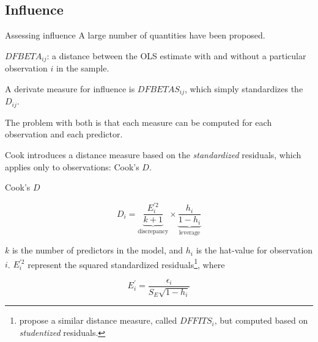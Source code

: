 \documentclass[12pt,english,pdf,xcolor=dvipsnames,aspectratio=169,handout]{beamer}\usepackage[]{graphicx}\usepackage[]{xcolor}
\begin{document}
\subsection{Influence}

\begin{frame}{Assessing influence}
A large number of quantities have been proposed.\bigskip

\underline{$DFBETA_{ij}$}: a distance between the OLS estimate with and without a particular observation $i$ in the sample.\bigskip

A derivate measure for influence is \underline{$DFBETAS_{ij}$}, which simply standardizes the $D_{ij}$.\bigskip

The problem with both is that each measure can be computed for each observation and each predictor.\bigskip

Cook \citeyear{cook1977} introduces a distance measure based on the \textit{standardized} residuals, which applies only to observations: Cook's $D$.

\end{frame}



\begin{frame}{Cook's $D$}

\begin{equation}
D_{i} = \underbrace{\frac{E_i^{'2}}{k+1}}_{\text{discrepancy}} \times \underbrace{\frac{h_i}{1-h_i}}_{\text{leverage}}
\end{equation}

$k$ is the number of predictors in the model, and $h_i$ is the hat-value for observation $i$. $E_i^{'2}$ represent the squared standardized residuals\footnote{ propose a similar distance measure, called $DFFITS_i$, but computed based on \textit{studentized} residuals.}, where

\begin{equation}
E_i^{'} = \frac{\epsilon_i}{S_E\sqrt{1 - h_i}}
\end{equation}

\end{frame}
\end{document}
